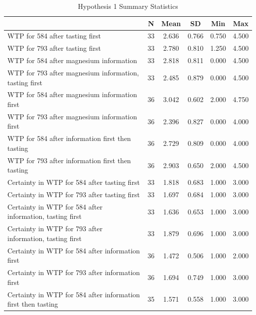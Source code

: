\begin{table}[htbp]\centering
\def\sym#1{\ifmmode^{#1}\else\(^{#1}\)\fi}
\caption{Hypothesis 1 Summary Statistics}
\begin{tabular}{l*{1}{ccccc}}
\toprule
                    &           N&        Mean&          SD&         Min&         Max\\
\midrule
WTP for 584 after tasting first&          33&       2.636&       0.766&       0.750&       4.500\\
WTP for 793 after tasting first&          33&       2.780&       0.810&       1.250&       4.500\\
WTP for 584 after magnesium information&          33&       2.818&       0.811&       0.000&       4.500\\
WTP for 793 after magnesium information, tasting first&          33&       2.485&       0.879&       0.000&       4.500\\
WTP for 584 after magnesium information first&          36&       3.042&       0.602&       2.000&       4.750\\
WTP for 793 after magnesium information first&          36&       2.396&       0.827&       0.000&       4.000\\
WTP for 584 after information first then tasting&          36&       2.729&       0.809&       0.000&       4.000\\
WTP for 793 after information first then tasting&          36&       2.903&       0.650&       2.000&       4.500\\
Certainty in WTP for 584 after tasting first&          33&       1.818&       0.683&       1.000&       3.000\\
Certainty in WTP for 793 after tasting first&          33&       1.697&       0.684&       1.000&       3.000\\
Certainty in WTP for 584 after information, tasting first&          33&       1.636&       0.653&       1.000&       3.000\\
Certainty in WTP for 793 after information, tasting first&          33&       1.879&       0.696&       1.000&       3.000\\
Certainty in WTP for 584 after information first&          36&       1.472&       0.506&       1.000&       2.000\\
Certainty in WTP for 793 after information first&          36&       1.694&       0.749&       1.000&       3.000\\
Certainty in WTP for 584 after information first then tasting&          35&       1.571&       0.558&       1.000&       3.000\\

\end{tabular}
\end{table}
